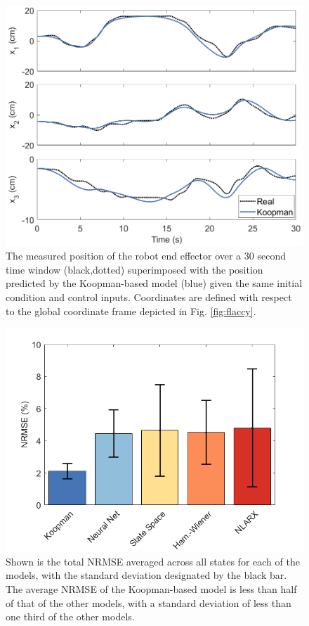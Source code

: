 \begin{figure}
    \centering
    \includegraphics[width=0.9\linewidth]{figures/koopPlot4_cropped.png}
    \caption{
    The measured position of the robot end effector over a 30 second time window (black,dotted) superimposed with the position predicted by the Koopman-based model (blue) given the same initial condition and control inputs. Coordinates are defined with respect to the global coordinate frame depicted in Fig. \ref{fig:flaccy}.}
    \label{fig:koopmanSim}
\end{figure}

\begin{figure}
    \centering
    \includegraphics[width=\linewidth]{figures/NRMSE2.png}
    \caption{Shown is the total NRMSE averaged across all states for each of the models, with the standard deviation designated by the black bar. The average NRMSE of the Koopman-based model is less than half of that of the other models, with a standard deviation of less than one third of the other models.}
    \label{fig:comparison}
\end{figure}


